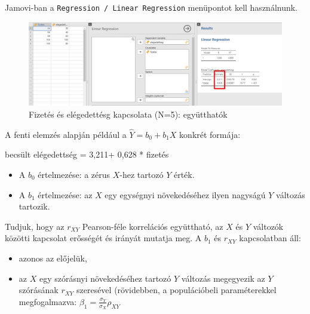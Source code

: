 \documentclass[
  letterpaper,
]{krantz}
\makeatletter
\newenvironment{Shaded}{\begin{snugshade}}{\end{snugshade}}
\newcommand{\NormalTok}[1]{\textcolor[rgb]{0.00,0.23,0.31}{#1}}
\providecommand{\tightlist}{%
  \setlength{\itemsep}{0pt}\setlength{\parskip}{0pt}}\usepackage{longtable,booktabs,array}
\newenvironment{kframe}{%
\medskip{}
\setlength{\fboxsep}{.8em}
 \def\at@end@of@kframe{}%
 \ifinner\ifhmode%
  \def\at@end@of@kframe{\end{minipage}}%
  \begin{minipage}{\columnwidth}%
 \fi\fi%
 \def\FrameCommand##1{\hskip\@totalleftmargin \hskip-\fboxsep
 \colorbox{shadecolor}{##1}\hskip-\fboxsep
     \hskip-\linewidth \hskip-\@totalleftmargin \hskip\columnwidth}%
 \MakeFramed {\advance\hsize-\width
   \@totalleftmargin\z@ \linewidth\hsize
   \@setminipage}}%
 {\par\unskip\endMakeFramed%
 \at@end@of@kframe}
\renewenvironment{Shaded}{\begin{kframe}}{\end{kframe}}
\makeatother
\begin{document}
Jamovi-ban a \texttt{Regression\ /\ Linear\ Regression} menüpontot kell
használnunk.

\begin{figure}

{\centering \includegraphics{./images/lin_reg_fizetes_elegedettseg_02_kep.jpg}

}

\caption{Fizetés és elégedettésg kapcsolata (N=5): együtthatók}

\end{figure}

A fenti elemzés alapján például a \(\hat{Y}=b_0+b_1 X\) konkrét formája:

\begin{Shaded}
\begin{Highlighting}[]
\NormalTok{becsült elégedettség = 3,211+ 0,628 * fizetés}
\end{Highlighting}
\end{Shaded}

\begin{itemize}
\tightlist
\item
  A \(b_0\) értelmezése: a zérus \(X\)-hez tartozó \(Y\) érték.
\item
  A \(b_1\) értelmezése: az \(X\) egy egységnyi növekedéséhez ilyen
  nagyságú \(Y\) változás tartozik.
\end{itemize}

Tudjuk, hogy az \(r_{XY}\) Pearson-féle korrelációs együttható, az \(X\)
és \(Y\) változók közötti kapcsolat erősségét és irányát mutatja meg. A
\(b_1\) és \(r_{XY}\) kapcsolatban áll:

\begin{itemize}
\tightlist
\item
  azonos az előjelük,
\item
  az \(X\) egy szórásnyi növekedéséhez tartozó \(Y\) változás megegyezik
  az \(Y\) szórásának \(r_{XY}\) szeresével (rövidebben, a populációbeli
  paraméterekkel megfogalmazva:
  \(\beta_1=\frac{\sigma_Y}{\sigma_X}\rho_{XY}\)
\end{itemize}
\end{document}
